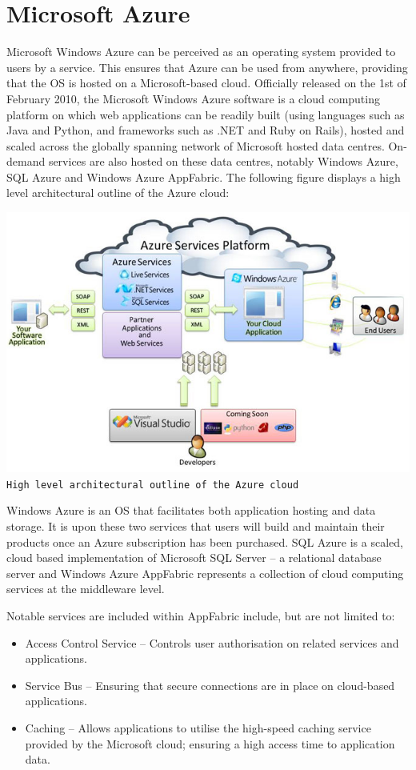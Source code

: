\chapter{Microsoft Azure}
Microsoft Windows Azure can be perceived as an operating system provided to users by a service. This ensures that Azure can be used from anywhere, providing that the OS is hosted on a Microsoft-based cloud. Officially released on the 1st of February 2010, the Microsoft Windows Azure software is a cloud computing platform on which web applications can be readily built (using languages such as Java and Python, and frameworks such as .NET and Ruby on Rails), hosted and scaled across the globally spanning network of Microsoft hosted data centres. On-demand services are also hosted on these data centres, notably Windows Azure\ftAone, SQL Azure and Windows Azure AppFabric. The following figure displays a high level architectural outline of the Azure cloud:\ftAoneText

\begin{center}
\includegraphics[scale=0.8]{figs/Azure.png} \\
\texttt{High level architectural outline of the Azure cloud}\ftAimg\ftAimgText
\end{center}

Windows Azure is an OS that facilitates both application hosting and data storage. It is upon these two services that users will build and maintain their products once an Azure subscription has been purchased. SQL Azure is a scaled, cloud based implementation of Microsoft SQL Server -- a relational database server and Windows Azure AppFabric represents a collection of cloud computing services at the middleware level.

Notable services are included within AppFabric include, but are not limited to\ftAtwo:\ftAtwoText
\begin{itemize}
\item Access Control Service -- Controls user authorisation on related services and applications.
\item Service Bus -- Ensuring that secure connections are in place on cloud-based applications.
\item Caching -- Allows applications to utilise the high-speed caching service provided by the Microsoft cloud; ensuring a high access time to application data.
\end{itemize}


